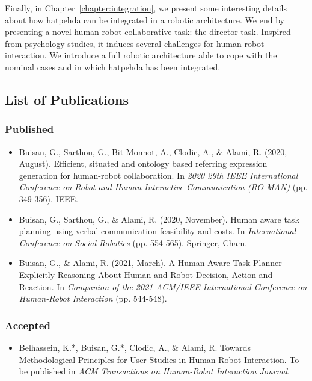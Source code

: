 \documentclass[a4paper,11pt,twoside]{StyleThese}
\begin{document}
Finally, in Chapter~\ref{chapter:integration}, we present some interesting details about how \acrshort{hatpehda} can be integrated in a robotic architecture. We end by presenting a novel human robot collaborative task: the director task. Inspired from psychology studies, it induces several challenges for human robot interaction. We introduce a full robotic architecture able to cope with the nominal cases and in which \acrshort{hatpehda} has been integrated.

\subsection*{List of Publications}
\subsubsection*{Published}
\begin{itemize}
\item Buisan, G., Sarthou, G., Bit-Monnot, A., Clodic, A., \& Alami, R. (2020, August). Efficient, situated and ontology based referring expression generation for human-robot collaboration. In \textit{2020 29th IEEE International Conference on Robot and Human Interactive Communication (RO-MAN)} (pp. 349-356). IEEE.

\item Buisan, G., Sarthou, G., \& Alami, R. (2020, November). Human aware task planning using verbal communication feasibility and costs. In \textit{International Conference on Social Robotics} (pp. 554-565). Springer, Cham.

\item Buisan, G., \& Alami, R. (2021, March). A Human-Aware Task Planner Explicitly Reasoning About Human and Robot Decision, Action and Reaction. In \textit{Companion of the 2021 ACM/IEEE International Conference on Human-Robot Interaction} (pp. 544-548).
\end{itemize}

\subsubsection*{Accepted}
\begin{itemize}
\item Belhassein, K.*, Buisan, G.*, Clodic, A., \& Alami, R. Towards Methodological Principles for User Studies in Human-Robot Interaction. To be published in \textit{ACM Transactions on Human-Robot Interaction Journal}.
\end{itemize}
\end{document}
